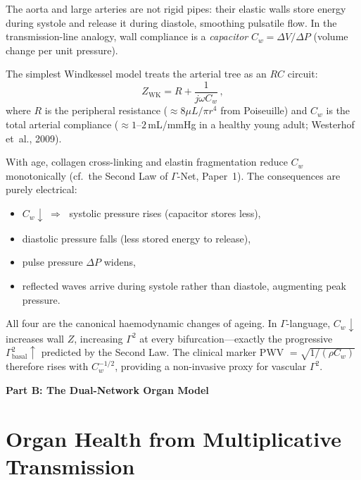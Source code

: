 \documentclass[aps,pre,twocolumn,superscriptaddress,floatfix]{revtex4-2}
\begin{document}
The aorta and large arteries are not rigid pipes:
their elastic walls store energy during systole and
release it during diastole, smoothing pulsatile flow.
In the transmission-line analogy, wall compliance is
a \emph{capacitor} $C_w = \Delta V / \Delta P$
(volume change per unit pressure).

The simplest Windkessel model treats the arterial
tree as an $RC$ circuit:
\begin{equation}
  Z_{\text{WK}} = R + \frac{1}{j\omega C_w}\,,
  \label{eq:windkessel}
\end{equation}
where $R$ is the peripheral resistance
($\approx 8\mu L / \pi r^4$ from Poiseuille) and
$C_w$ is the total arterial compliance
($\approx 1$--$2$\,mL/mmHg in a healthy young adult;
Westerhof et~al., 2009).

\begin{remark}
\label{rem:windkessel-ageing}
With age, collagen cross-linking and elastin
fragmentation reduce $C_w$ monotonically
(cf.\ the Second Law of $\Gamma$-Net, Paper~1).
The consequences are purely electrical:
\begin{itemize}
  \item $C_w \downarrow \;\Rightarrow\;$
    systolic pressure rises (capacitor stores less),
  \item diastolic pressure falls
    (less stored energy to release),
  \item pulse pressure $\Delta P$ widens,
  \item reflected waves arrive during systole
    rather than diastole, augmenting peak pressure.
\end{itemize}
All four are the canonical haemodynamic changes of
ageing.  In $\Gamma$-language, $C_w \downarrow$
increases wall $Z$, increasing $\Gamma^2$ at every
bifurcation---exactly the progressive
$\Gamma^2_{\text{basal}} \uparrow$ predicted by the
Second Law.
The clinical marker PWV $= \sqrt{1/(\rho C_w)}$
therefore rises with $C_w^{-1/2}$, providing a
non-invasive proxy for vascular $\Gamma^2$.
\end{remark}



\bigskip\noindent\textbf{\large Part B: The Dual-Network Organ Model}\medskip


\section{Organ Health from Multiplicative Transmission}
\label{sec:organ-model}
\end{document}
